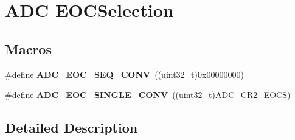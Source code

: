 \hypertarget{group___a_d_c___e_o_c_selection}{\section{A\-D\-C E\-O\-C\-Selection}
\label{group___a_d_c___e_o_c_selection}
}
\subsection*{Macros}
\begin{DoxyCompactItemize}
\item 
\hypertarget{group___a_d_c___e_o_c_selection_ga6c71ff64c9ecc9ba19ac088009f36cd8}{\#define {\bfseries A\-D\-C\-\_\-\-E\-O\-C\-\_\-\-S\-E\-Q\-\_\-\-C\-O\-N\-V}~((uint32\-\_\-t)0x00000000)}\label{group___a_d_c___e_o_c_selection_ga6c71ff64c9ecc9ba19ac088009f36cd8}

\item 
\hypertarget{group___a_d_c___e_o_c_selection_ga4c455483d74c1be899d4b2e8f45f202b}{\#define {\bfseries A\-D\-C\-\_\-\-E\-O\-C\-\_\-\-S\-I\-N\-G\-L\-E\-\_\-\-C\-O\-N\-V}~((uint32\-\_\-t)\hyperlink{group___peripheral___registers___bits___definition_gaf9dac2004ab20295e04012060ab24aeb}{A\-D\-C\-\_\-\-C\-R2\-\_\-\-E\-O\-C\-S})}\label{group___a_d_c___e_o_c_selection_ga4c455483d74c1be899d4b2e8f45f202b}

\end{DoxyCompactItemize}


\subsection{Detailed Description}

